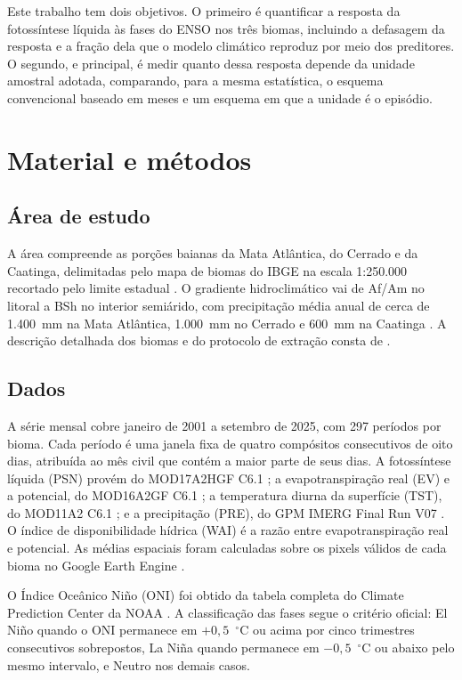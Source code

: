 \documentclass[a4paper,fleqn]{cas-sc}
\begin{document}
Este trabalho tem dois objetivos. O primeiro é quantificar a resposta da fotossíntese líquida às fases do ENSO nos três biomas, incluindo a defasagem da resposta e a fração dela que o modelo climático reproduz por meio dos preditores. O segundo, e principal, é medir quanto dessa resposta depende da unidade amostral adotada, comparando, para a mesma estatística, o esquema convencional baseado em meses e um esquema em que a unidade é o episódio.

\section{Material e métodos}

\subsection{Área de estudo}

A área compreende as porções baianas da Mata Atlântica, do Cerrado e da Caatinga, delimitadas pelo mapa de biomas do IBGE na escala 1:250.000 recortado pelo limite estadual \citep{ibge2019}. O gradiente hidroclimático vai de Af/Am no litoral a BSh no interior semiárido, com precipitação média anual de cerca de 1.400~mm na Mata Atlântica, 1.000~mm no Cerrado e 600~mm na Caatinga \citep{alvares2013}. A descrição detalhada dos biomas e do protocolo de extração consta de \citet{oliveira2026}.

\subsection{Dados}

A série mensal cobre janeiro de 2001 a setembro de 2025, com 297 períodos por bioma. Cada período é uma janela fixa de quatro compósitos consecutivos de oito dias, atribuída ao mês civil que contém a maior parte de seus dias. A fotossíntese líquida (PSN) provém do MOD17A2HGF C6.1 \citep{running2021gpp}; a evapotranspiração real (EV) e a potencial, do MOD16A2GF C6.1 \citep{running2021et}; a temperatura diurna da superfície (TST), do MOD11A2 C6.1 \citep{wan2021}; e a precipitação (PRE), do GPM IMERG Final Run V07 \citep{huffman2023}. O índice de disponibilidade hídrica (WAI) é a razão entre evapotranspiração real e potencial. As médias espaciais foram calculadas sobre os pixels válidos de cada bioma no Google Earth Engine \citep{gorelick2017}.

O Índice Oceânico Niño (ONI) foi obtido da tabela completa do Climate Prediction Center da NOAA \citep{noaacpc2025}. A classificação das fases segue o critério oficial: El Niño quando o ONI permanece em $+0{,}5$~$^{\circ}$C ou acima por cinco trimestres consecutivos sobrepostos, La Niña quando permanece em $-0{,}5$~$^{\circ}$C ou abaixo pelo mesmo intervalo, e Neutro nos demais casos.
\end{document}
